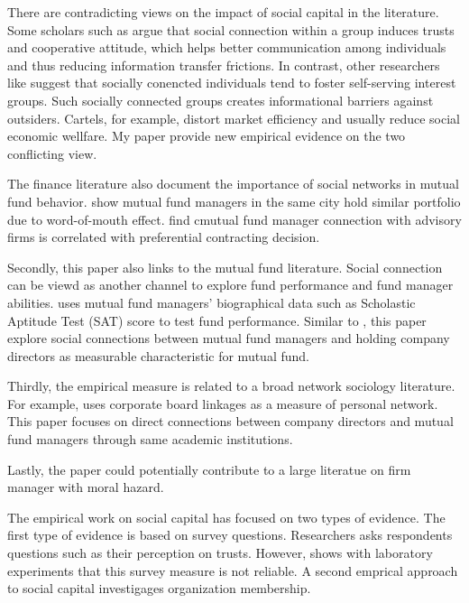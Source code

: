 \documentclass[11pt]{article}
\begin{document}
\begin{doublespace}
There are contradicting views on the impact of social capital in the literature. Some scholars such as \cite{putnam1994making} argue that social connection within a group induces trusts and cooperative attitude, which helps better communication among individuals and thus reducing information transfer frictions. In contrast, other researchers like \cite{olson1982rise} suggest that socially conencted individuals tend to foster self-serving interest groups. Such socially connected groups creates informational barriers against outsiders. Cartels, for example, distort market efficiency and usually reduce social economic wellfare. My paper provide new empirical evidence on the two conflicting view.

The finance literature also document the importance of social networks in mutual fund behavior. \cite{hong2005thy} show mutual fund managers in the same city hold similar portfolio due to word-of-mouth effect. \cite{kuhnen2005social} find cmutual fund manager connection with advisory firms is correlated with preferential contracting decision. 

Secondly, this paper also links to the mutual fund literature. Social connection can be viewd as another channel to explore fund performance and fund manager abilities. \cite{chevalier1999some} uses mutual fund managers' biographical data such as Scholastic Aptitude Test (SAT) score to test fund performance. Similar to \cite{cohen2008small}, this paper explore social connections between mutual fund managers and holding company directors as measurable characteristic for mutual fund. 

Thirdly, the empirical measure is related to a broad network sociology literature. For example, \cite{useem1984inner} uses corporate board linkages as a measure of personal network. This paper focuses on direct connections between company directors and mutual fund managers through same academic institutions. 

Lastly, the paper could potentially contribute to a large literatue on firm manager with moral hazard.


The empirical work on social capital has focused on two types of evidence. The first type of evidence is based on survey questions. Researchers asks respondents questions such as their perception on trusts. However, \cite{glaeser2000measuring} shows with laboratory experiments that this survey measure is not reliable.  A second emprical approach to social capital investigages organization membership.













\end{doublespace}
\end{document}
